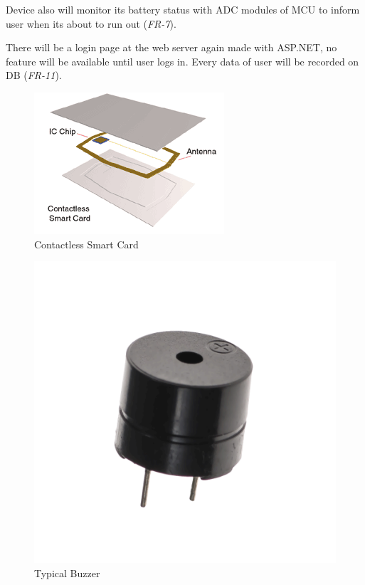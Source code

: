 \documentclass{scrreprt}
\begin{document}
Device also will monitor its battery status with ADC modules of MCU to inform user when its about to run out (\textit{FR-7}). 

There will be a login page at the web server again made with ASP.NET, no feature will be available until user logs in. Every data of user will be recorded on DB (\textit{FR-11}).



\begin{figure}[H]
 \begin{center}
	\includegraphics[scale=0.5]{card}
  	\caption{Contactless Smart Card}
  \end{center}
\end{figure}

\begin{figure}[H]
 \begin{center}
	\includegraphics[scale=0.1]{buzzer}
  	\caption{Typical Buzzer}
  \end{center}
\end{figure}
\end{document}
